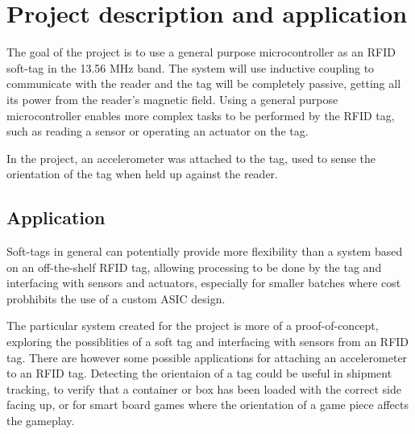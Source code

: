\section{Project description and application}
The goal of the project is to use a general purpose microcontroller as an RFID soft-tag in the 13.56 MHz band.
The system will use inductive coupling to communicate with the reader and the tag will be completely passive, getting all its power from the reader's magnetic field.
Using a general purpose microcontroller enables more complex tasks to be performed by the RFID tag, such as reading a sensor or operating an actuator on the tag.

In the project, an accelerometer was attached to the tag, used to sense the orientation of the tag when held up against the reader.

\subsection{Application}
Soft-tags in general can potentially provide more flexibility than a system based on an off-the-shelf RFID tag, allowing processing to be done by the tag and interfacing with sensors and actuators, especially for smaller batches where cost probhibits the use of a custom ASIC design.

The particular system created for the project is more of a proof-of-concept, exploring the possiblities of a soft tag and interfacing with sensors from an RFID tag.
There are however some possible applications for attaching an accelerometer to an RFID tag.
Detecting the orientaion of a tag could be useful in shipment tracking, to verify that a container or box has been loaded with the correct side facing up, or for smart board games where the orientation of a game piece affects the gameplay.
